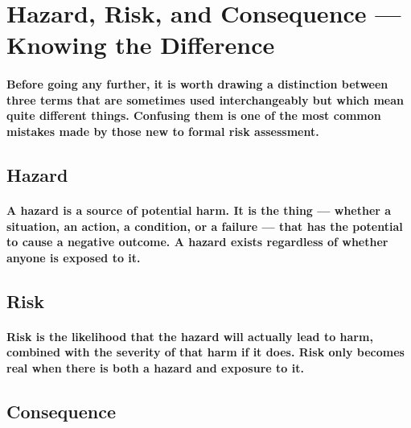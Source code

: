 \section{Hazard, Risk, and Consequence — Knowing the Difference}

\paragraph{Before going any further, it is worth drawing a distinction between three terms that are sometimes used interchangeably but which mean quite different things. Confusing them is one of the most common mistakes made by those new to formal risk assessment.}

\subsection{Hazard}

\paragraph{A hazard is a source of potential harm. It is the thing — whether a situation, an action, a condition, or a failure — that has the potential to cause a negative outcome. A hazard exists regardless of whether anyone is exposed to it.}


\subsection{Risk}

\paragraph{Risk is the likelihood that the hazard will actually lead to harm, combined with the severity of that harm if it does. Risk only becomes real when there is both a hazard and exposure to it.}


\subsection{Consequence}

